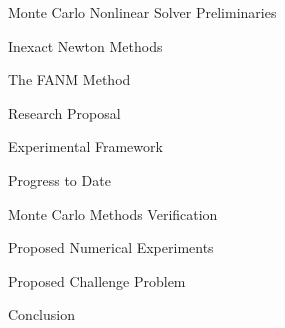 \documentclass{beamer}
\begin{document}
\begin{frame}{Monte Carlo Nonlinear Solver Preliminaries}

\end{frame}

\begin{frame}{Inexact Newton Methods}

\end{frame}

\begin{frame}{The FANM Method}

\end{frame}

\begin{frame}{Research Proposal}

\end{frame}

\begin{frame}{Experimental Framework}

\end{frame}

\begin{frame}{Progress to Date}

\end{frame}

\begin{frame}{Monte Carlo Methods Verification}

\end{frame}

\begin{frame}{Proposed Numerical Experiments}

\end{frame}

\begin{frame}{Proposed Challenge Problem}

\end{frame}

\begin{frame}{Conclusion}

\end{frame}

\end{document}
